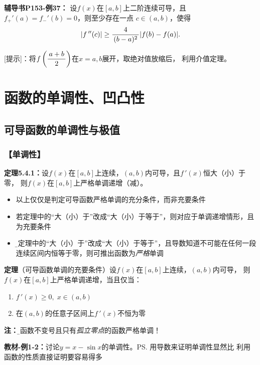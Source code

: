 {\bf 辅导书P153-例37：}
设$f(x)$在$[a,b]$上二阶连续可导，且$f_+'(a)=f_-'(b)=0$，则至少存在一点
$c\in(a,b)$，使得
$$|f\,''(c)|\geq \displaystyle\frac{\,{4}\,}{\,{(b-a)^2}\,}|f(b)-f(a)|.$$

[提示]：将$f\left(\displaystyle\frac{\,{a+b}\,}{\,{2}\,}\right)$在$x=a,b$展开，取绝对值放缩后，
利用介值定理。



\section{函数的单调性、凹凸性}

\subsection{可导函数的单调性与极值}

\subsubsection{【单调性】}

{\bf 定理5.4.1：}设$f(x)$在$[a,b]$上连续，$(a,b)$内可导，且$f\,'(x)$恒大（小）于零，
则$f(x)$在$[a,b]$上严格单调递增（减）。

\begin{itemize}
  \setlength{\itemindent}{1cm}
  \item 以上仅仅是判定可导函数严格单调的充分条件，而非充要条件 
  \item 若定理中的“大（小）于”改成“大（小）于等于”，则对应于单调递增情形，且为充要条件
  \item {\b 若定理中的“大（小）于”改成“大（小）于等于”，且导数知道不可能在任何一段
  连续区间内恒等于零，则可推出函数为{\it 严格}单调}
\end{itemize}

{\bf 定理}（可导函数单调的充要条件）设$f(x)$在$[a,b]$上连续，$(a,b)$内可导，
则$f(x)$在$[a,b]$上严格单调递增，当且仅当：
\begin{enumerate}[(1)]
  \setlength{\itemindent}{1cm}
  \item $f\,'(x)\geq 0,\;x\in(a,b)$
  \item 在$(a,b)$的任意子区间上$f\,'(x)$不恒为零
\end{enumerate}

{\bf 注：}{\b 导函数不变号且只有{\it 孤立零点}的函数严格单调！}

{\bf 教材-例1-2：}讨论$y=x-\sin x$的单调性。\ps{用导数来证明单调性显然比
利用函数的性质直接证明要容易得多}

